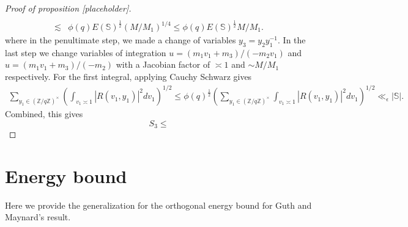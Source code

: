 \begin{proof}[{Proof of proposition [placeholder]}]
\begin{align*}
       \\ \lesssim&
       \phi(q)E(\mathbb{S})^{\frac{1}{2}}(M/M_1)^{1/4}\leq\phi(q)E(\mathbb{S})^{\frac{1}{2}}M/M_1.
       \end{align*}
       where in the penultimate step, we made a change of variables $y_3=y_2y_1^{-1}$. In the last step we change variables of integration $u=(m_1v_1+m_3)/(-m_2v_1)$ and $u=(m_1v_1+m_3)/(-m_2)$ with a Jacobian factor of $\asymp 1$ and $\sim M/M_1$ respectively. 
       For the first integral, applying Cauchy Schwarz gives \begin{align*}
        \sum_{y_1\in (\mathbb{Z}/q\mathbb{Z})^\times} \left(\int_{v_1\asymp 1} 
        \left|R\left(v_1,y_1\right)\right|^2dv_1\right)^{1/2} 
        \leq  \phi(q)^{\frac{1}{2}}\left(\sum_{y_1\in (\mathbb{Z}/q\mathbb{Z})^\times} \int_{v_1\asymp 1} 
        \left|R\left(v_1,y_1\right)\right|^2dv_1\right)^{1/2} 
        \ll_{\epsilon} |\mathbb{S}|.
       \end{align*}
       Combined, this gives \[
       S_3 \leq 
       \]
\end{proof}

\section{Energy bound}
Here we provide the generalization for the orthogonal energy bound for Guth and Maynard's result. 

